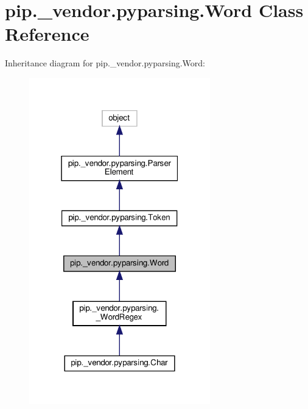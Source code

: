 \hypertarget{classpip_1_1__vendor_1_1pyparsing_1_1Word}{}\section{pip.\+\_\+vendor.\+pyparsing.\+Word Class Reference}
\label{classpip_1_1__vendor_1_1pyparsing_1_1Word}


Inheritance diagram for pip.\+\_\+vendor.\+pyparsing.\+Word\+:
\nopagebreak
\begin{figure}[H]
\begin{center}
\leavevmode
\includegraphics[width=223pt]{classpip_1_1__vendor_1_1pyparsing_1_1Word__inherit__graph}
\end{center}
\end{figure}


